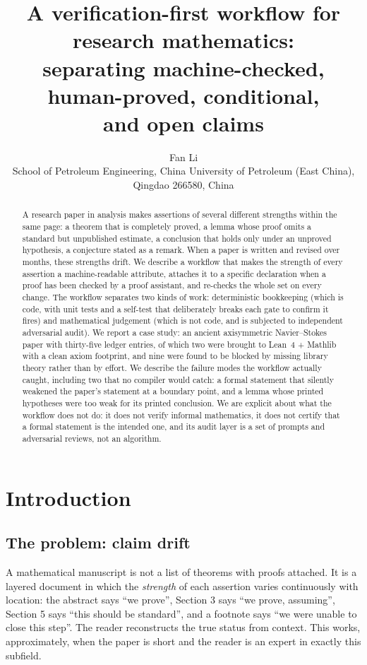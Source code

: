 \documentclass[11pt]{article}
\title{A verification-first workflow for research mathematics:\\
separating machine-checked, human-proved, conditional,\\
and open claims}
\author{Fan Li\\[8pt]
{\small School of Petroleum Engineering, China University of Petroleum (East China),}\\[2pt]
{\small Qingdao 266580, China}}
\date{}
\newcommand{\Lean}{Lean}
\begin{document}
\maketitle

\begin{abstract}
A research paper in analysis makes assertions of several different strengths
within the same page: a theorem that is completely proved, a lemma whose proof
omits a standard but unpublished estimate, a conclusion that holds only under
an unproved hypothesis, a conjecture stated as a remark. When a paper is
written and revised over months, these strengths drift. We describe a workflow
that makes the strength of every assertion a machine-readable attribute,
attaches it to a specific declaration when a proof has been checked by a proof
assistant, and re-checks the whole set on every change. The workflow separates
two kinds of work: deterministic bookkeeping (which is code, with unit tests
and a self-test that deliberately breaks each gate to confirm it fires) and
mathematical judgement (which is not code, and is subjected to independent
adversarial audit).
We report a case study: an ancient axisymmetric Navier--Stokes paper with
thirty-five ledger entries, of which two were brought to \Lean~4 + Mathlib with
a clean axiom footprint, and nine were found to be blocked by missing library
theory rather than by effort. We describe the failure modes the
workflow actually caught, including two that no compiler would catch: a
formal statement that silently weakened the paper's statement at a boundary
point, and a lemma whose printed hypotheses were too weak for its printed
conclusion. We are explicit about what the workflow does not do: it does not
verify informal mathematics, it does not certify that a formal statement is the
intended one, and its audit layer is a set of prompts and adversarial reviews,
not an algorithm.
\end{abstract}

\tableofcontents

\section{Introduction}

\subsection{The problem: claim drift}

A mathematical manuscript is not a list of theorems with proofs attached. It is
a layered document in which the \emph{strength} of each assertion varies
continuously with location: the abstract says ``we prove'', Section 3 says
``we prove, assuming'', Section 5 says ``this should be standard'', and a
footnote says ``we were unable to close this step''. The reader reconstructs
the true status from context. This works, approximately, when the paper is
short and the reader is an expert in exactly this subfield.
\end{document}

